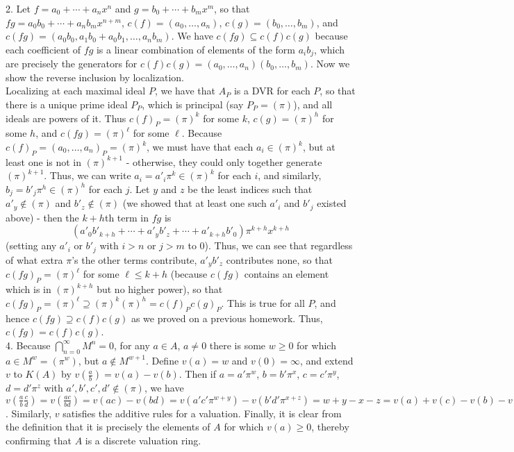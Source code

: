 \documentclass[11pt]{article}
\begin{document}
\num{2.} Let $f=a_0+\cdots+a_nx^n$ and $g=b_0+\cdots+b_mx^m$,
so that $fg=a_0b_0+\cdots+a_nb_mx^{n+m}$, $c(f)=(a_0,\ldots,a_n)$,
$c(g)=(b_0,\ldots,b_m)$, and $c(fg)=(a_0b_0,a_1b_0+a_0b_1,\ldots,a_nb_m)$. We
have $c(fg)\subseteq c(f)c(g)$ because each coefficient of $fg$ is a linear
combination of elements of the form $a_ib_j$, which are precisely the
generators for $c(f)c(g)=(a_0,\ldots,a_n)(b_0,\ldots,b_m)$. Now we show the
reverse inclusion by localization. \\

Localizing at each maximal ideal $P$, we have that $A_P$ is a DVR for
each $P$, so that there is a unique prime ideal $P_P$, which is principal
(say $P_P=(\pi)$), and all ideals are powers of it. Thus $c(f)_P=(\pi)^k$
for some $k$, $c(g)=(\pi)^h$ for some $h$, and $c(fg)=(\pi)^\ell$ for
some $\ell$. Because $c(f)_P=(a_0,\ldots,a_n)_P=(\pi)^k$, we must have
that each $a_i\in (\pi)^k$, but at least one is not in $(\pi)^{k+1}$
- otherwise, they could only together generate $(\pi)^{k+1}$. Thus,
we can write $a_i=a'_i\pi^k\in(\pi)^k$ for each $i$, and similarly,
$b_j=b'_j\pi^h\in(\pi)^h$ for each $j$. Let $y$ and $z$ be the least indices
such that $a'_y\notin(\pi)$ and $b'_z\notin (\pi)$ (we showed that at least
one such $a'_i$ and $b'_j$ existed above) - then the $k+h$th term in $fg$ is
\[(a'_0b'_{k+h}+\cdots+a'_yb'_z+\cdots+a'_{k+h}b'_0)\pi^{k+h}x^{k+h}\]
(setting any $a'_i$ or $b'_j$ with $i>n$ or $j>m$ to 0). Thus, we can see
that regardless of what extra $\pi$'s the other terms contribute, $a'_yb'_z$
contributes none, so that $c(fg)_P=(\pi)^\ell$ for some $\ell\leq k+h$
(because $c(fg)$ contains an element which is in $(\pi)^{k+h}$ but no higher
power), so that $c(fg)_P=(\pi)^\ell\supseteq(\pi)^k(\pi)^h=c(f)_Pc(g)_P$. This
is true for all $P$, and hence $c(fg)\supseteq c(f)c(g)$ as we proved on a
previous homework. Thus, $c(fg)=c(f)c(g)$.\\

\num{4.} Because $\bigcap_{n=0}^\infty M^n=0$, for any $a\in A$,
$a\neq0$ there is some $w\geq0$ for which $a\in M^w=(\pi^w)$, but
$a\notin M^{w+1}$. Define $v(a)=w$ and $v(0)=\infty$, and extend
$v$ to $K(A)$ by $v(\frac{a}{b})=v(a)-v(b)$. Then if $a=a'\pi^w$,
$b=b'\pi^x$, $c=c'\pi^y$, $d=d'\pi^z$ with $a',b',c',d'\notin(\pi)$, we have
$v(\frac{a}{b}\frac{c}{d})=v(\frac{ac}{bd})=v(ac)-v(bd)=v(a'c'\pi^{w+y})-v(b'd'\pi^{x+z})=w+y-x-z=v(a)+v(c)-v(b)-v(d)=v(a)-v(b)+v(c)-v(d)=v(\frac{a}{b})v(\frac{c}{d})$.
Similarly, $v$ satisfies the additive rules for a valuation. Finally, it
is clear from the definition that it is precisely the elements of $A$ for
which $v(a)\geq0$, thereby confirming that $A$ is a discrete valuation ring.\\
\end{document}
